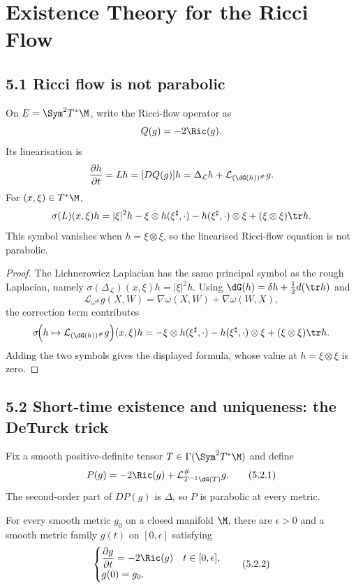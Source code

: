 \chapter{Existence Theory for the Ricci Flow}

\section*{5.1 \quad Ricci flow is not parabolic}

\begin{remark}
\label{topping-ricci-flow-linearisation-not-parabolic}

On $E=\Sym^2T^*\M$, write the Ricci-flow operator as
\[
Q(g)=-2\Ric(g).
\]
Its linearisation is
\[
\frac{\partial h}{\partial t}=Lh=[DQ(g)]h
 =\Delta_{\mathcal L}h+\mathcal L_{(\dG(h))^\#}g.
\]
For $(x,\xi)\in T^*\M$,
\[
\sigma(L)(x,\xi)h
 =|\xi|^2h-\xi\otimes h(\xi^\sharp,\cdot)
 -h(\xi^\sharp,\cdot)\otimes\xi+(\xi\otimes\xi)\tr h.
\]
This symbol vanishes when $h=\xi\otimes\xi$, so the linearised Ricci-flow
equation is not parabolic.
\end{remark}

\begin{proof}
\sketch The Lichnerowicz Laplacian has the same principal symbol as the
rough Laplacian, namely $\sigma(\Delta_{\mathcal L})(x,\xi)h=|\xi|^2h$.
Using $\dG(h)=\delta h+\frac12d(\tr h)$ and
\[
\mathcal L_{\omega^\#}g(X,W)=\nabla\omega(X,W)+\nabla\omega(W,X),
\]
the correction term contributes
\[
\sigma\!\Bigl(h\mapsto\mathcal L_{(\dG(h))^\#}g\Bigr)(x,\xi)h
 =-\xi\otimes h(\xi^\sharp,\cdot)
 -h(\xi^\sharp,\cdot)\otimes\xi+(\xi\otimes\xi)\tr h.
\]
Adding the two symbols gives the displayed formula, whose value at
$h=\xi\otimes\xi$ is zero.
\end{proof}

\section*{5.2 \quad Short-time existence and uniqueness: the DeTurck trick}

Fix a smooth positive-definite tensor
$T\in\Gamma(\Sym^2T^*\M)$ and define
\[
P(g)=-2\Ric(g)+\mathcal L_{T^{-1}\dG(T)}^{\#}g.
\tag{5.2.1}
\]
The second-order part of $DP(g)$ is $\Delta$, so $P$ is parabolic at every
metric.

\begin{theorem}
\label{topping-ricci-flow-short-time-existence}

For every smooth metric $g_0$ on a closed manifold $\M$, there are
$\epsilon>0$ and a smooth metric family $g(t)$ on $[0,\epsilon]$ satisfying
\[
\begin{cases}
\dfrac{\partial g}{\partial t}=-2\Ric(g) & t\in[0,\epsilon],\\
g(0)=g_0.
\end{cases}
\tag{5.2.2}
\]
\end{theorem}

